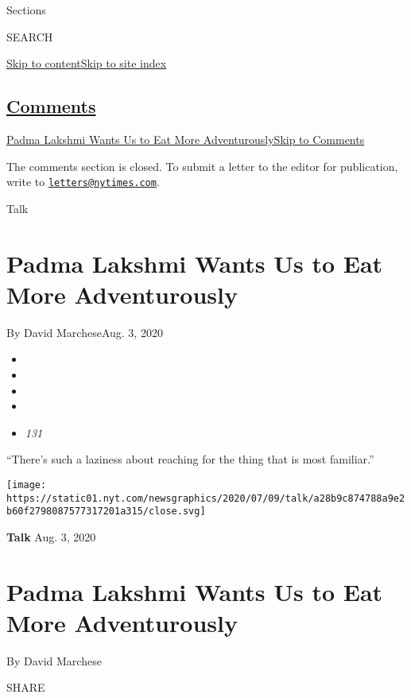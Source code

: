 Sections

SEARCH

\protect\hyperlink{site-content}{Skip to
content}\protect\hyperlink{site-index}{Skip to site index}

\hypertarget{comments}{%
\subsection{\texorpdfstring{\protect\hyperlink{commentsContainer}{Comments}}{Comments}}\label{comments}}

\href{}{Padma Lakshmi Wants Us to Eat More Adventurously}\href{}{Skip to
Comments}

The comments section is closed. To submit a letter to the editor for
publication, write to
\href{mailto:letters@nytimes.com}{\nolinkurl{letters@nytimes.com}}.

Talk

\hypertarget{padma-lakshmi-wants-us-to-eat-more-adventurously}{%
\section{Padma Lakshmi Wants Us to Eat More
Adventurously}\label{padma-lakshmi-wants-us-to-eat-more-adventurously}}

By David MarcheseAug. 3, 2020

\begin{itemize}
\item
\item
\item
\item
\item
  \emph{131}
\end{itemize}

``There's such a laziness about reaching for the thing that is most
familiar.''

\texttt{[image: https://static01.nyt.com/newsgraphics/2020/07/09/talk/a28b9c874788a9e2b60f2798087577317201a315/close.svg]}

\textbf{Talk} Aug. 3, 2020

\hypertarget{padma-lakshmi-wants-us-to-eat-more-adventurously-1}{%
\section{Padma Lakshmi Wants Us to Eat More
Adventurously}\label{padma-lakshmi-wants-us-to-eat-more-adventurously-1}}

By David Marchese

SHARE

